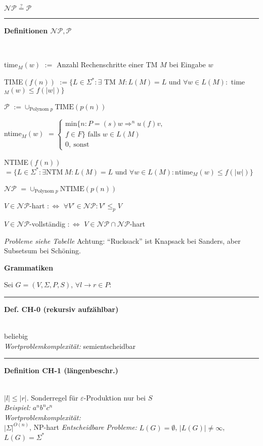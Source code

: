 \documentclass{article}
\newcommand{\h}[1]{\vspace{1ex}\begin{center}\small\textbf{#1}\end{center}}
\newcommand{\hh}[1]{{\vspace{1pt}\hrule\vspace{1pt} \noindent\textbf{#1}}\\}
\newcommand{\hhh}[1]{{\vspace{1pt}\noindent\emph{#1:}}}
\newenvironment{tightlist}{
\begin{list}{\textbullet}{
\setlength{\topsep}{-1ex}
\setlength{\itemsep}{-1ex}
\setlength{\leftmargin}{4ex}
}
}{
\end{list}
\vspace{1ex}
}
\begin{document}
\begin{multicols}{4}
\h{$\mathcal{NP} \stackrel{?}= \mathcal{P}$}
\hh{Definitionen $\mathcal{NP}, \mathcal{P}$ }
\begin{tightlist}
\item {time$_M(w)$} $:=$ Anzahl Rechenschritte einer TM $M$ bei Eingabe $w$\\
\item {TIME$(f(n))$} $:=\{L\in\Sigma^*:\exists$ TM $M:L(M) = L$ und $\forall w\in L(M):$ time$_M(w)\le f(|w|)\}$\\
\item {$\mathcal{P}$} $:=\cup_{\text{Polynom }p}\text{TIME}(p(n) )$\\
\item {ntime$_M(w)$} $=\begin{cases}\text{min}\{n:P=(s)w\Rightarrow^n u(f)v,\\ f\in F\} \text{ falls }w\in L(M)\\ 0,\ \text{sonst}\end{cases}$\\
\item {NTIME$(f(n))$} $=\{L\in\Sigma^*:\exists\text{NTM}\ M:L(M) = L\text{ und }\forall w\in L(M):\text{ntime}_M(w)\le f(|w|)\}$\\
\item {$\mathcal{NP}$} $=\cup_{\text{Polynom }p}\text{NTIME}(p(n))$\\
\item $V\in\mathcal{NP}$-hart $:\Leftrightarrow$ $\forall V'\in\mathcal{NP}: V'\le_pV$
\item $V\in\mathcal{NP}$-vollständig $:\Leftrightarrow$ $V\in \mathcal{NP}\cap\mathcal{NP}$-hart
\end{tightlist}

\emph{Probleme siehe Tabelle}
Achtung: "`Rucksack"' ist Knapsack bei Sanders, aber Subsetsum bei Schöning.

\h{Grammatiken}
Sei $G=(V, \Sigma, P, S)$, $\forall l\to r\in P:$\\
\hh{Def. CH-0 (rekursiv aufzählbar)}
beliebig\\
\hhh{Wortproblemkomplexität} semientscheidbar
\hh{Definition CH-1 (längenbeschr.)}
$|l|\le |r|$. Sonderregel für $\varepsilon$-Produktion nur bei $S$\\
\hhh{Beispiel} $a^nb^nc^n$\\
\hhh{Wortproblemkomplexität}\\ $|\Sigma|^{O(n)}$, NP-hart
\hhh{Entscheidbare Probleme}
$L(G) = \emptyset$, $|L(G)|\ne\infty$, $L(G)=\Sigma^*$


\end{multicols}
\end{document}

